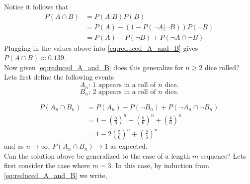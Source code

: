 \documentclass[12pt,a4paper]{article}
\begin{document}
Notice it follows that
\begin{align}
P(A \cap B)     &= P(A|B)P(B)\\
                &= P(A) - (1 - P(\neg A|\neg B)) P(\neg B)\\
                &= P(A) - P(\neg B) + P(\neg A \cap \neg B)
\label{eq:reduced_A_and_B}
\end{align}
Plugging in the values above into \cref{eq:reduced_A_and_B} gives $P(A \cap B) \approx 0.139$.\\

Now given \cref{eq:reduced_A_and_B} does this generalize for $n\geq 2$ dice rolled? Lets first define the following events
\begin{equation}
A_n \text{: 1 appears in a roll of $n$ dice.}
\end{equation}
\begin{equation}
B_n \text{: 2 appears in a roll of $n$ dice.}
\end{equation}

\begin{align}
P(A_n \cap B_n) &= P(A_n) - P(\neg B_n) + P(\neg A_n \cap \neg B_n)\\
                &=  1-\left(\frac{5}{6}\right)^n -\left(\frac{5}{6}\right)^n + \left(\frac{4}{6}\right)^n\\
                &= 1 - 2\left(\frac{5}{6}\right)^n + \left(\frac{2}{3}\right)^n
\label{eq:A_and_B_sol}
\end{align}
and as $n\to\infty$, $P(A_n \cap B_n) \to 1$ as expected.\\

Can the solution above be generalized to the case of a length $m$ sequence? Lets first consider the case where $m=3$. In this case, by induction from \cref{eq:reduced_A_and_B} we write,\\
\end{document}
